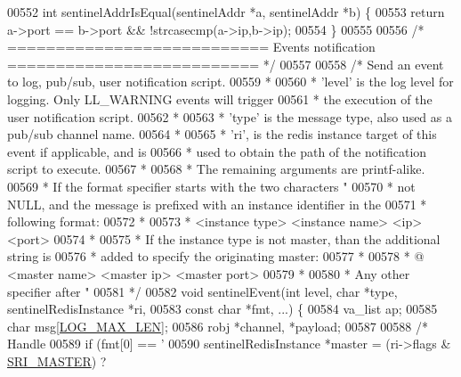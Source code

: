 \begin{DoxyCode}
{{00552 \textcolor{keywordtype}{int} sentinelAddrIsEqual(sentinelAddr *a, sentinelAddr *b) \{
00553     \textcolor{keywordflow}{return} a->port == b->port && !strcasecmp(a->ip,b->ip);
00554 \}
00555 
00556 \textcolor{comment}{/* =========================== Events notification ========================== */}
00557 
00558 \textcolor{comment}{/* Send an event to log, pub/sub, user notification script.}
00559 \textcolor{comment}{ *}
00560 \textcolor{comment}{ * 'level' is the log level for logging. Only LL\_WARNING events will trigger}
00561 \textcolor{comment}{ * the execution of the user notification script.}
00562 \textcolor{comment}{ *}
00563 \textcolor{comment}{ * 'type' is the message type, also used as a pub/sub channel name.}
00564 \textcolor{comment}{ *}
00565 \textcolor{comment}{ * 'ri', is the redis instance target of this event if applicable, and is}
00566 \textcolor{comment}{ * used to obtain the path of the notification script to execute.}
00567 \textcolor{comment}{ *}
00568 \textcolor{comment}{ * The remaining arguments are printf-alike.}
00569 \textcolor{comment}{ * If the format specifier starts with the two characters "%
00570 \textcolor{comment}{ * not NULL, and the message is prefixed with an instance identifier in the}
00571 \textcolor{comment}{ * following format:}
00572 \textcolor{comment}{ *}
00573 \textcolor{comment}{ *  <instance type> <instance name> <ip> <port>}
00574 \textcolor{comment}{ *}
00575 \textcolor{comment}{ *  If the instance type is not master, than the additional string is}
00576 \textcolor{comment}{ *  added to specify the originating master:}
00577 \textcolor{comment}{ *}
00578 \textcolor{comment}{ *  @ <master name> <master ip> <master port>}
00579 \textcolor{comment}{ *}
00580 \textcolor{comment}{ *  Any other specifier after "%
00581 \textcolor{comment}{ */}
00582 \textcolor{keywordtype}{void} sentinelEvent(\textcolor{keywordtype}{int} level, \textcolor{keywordtype}{char} *type, sentinelRedisInstance *ri,
00583                    \textcolor{keyword}{const} \textcolor{keywordtype}{char} *fmt, ...) \{
00584     va\_list ap;
00585     \textcolor{keywordtype}{char} msg[\hyperlink{server_8h_a37cd05cbfd7fb52ad21d3a822cff2ee6}{LOG\_MAX\_LEN}];
00586     robj *channel, *payload;
00587 
00588     \textcolor{comment}{/* Handle %
00589     \textcolor{keywordflow}{if} (fmt[0] == \textcolor{stringliteral}{'%
00590         sentinelRedisInstance *master = (ri->flags & \hyperlink{sentinel_8c_a2ee83e5ff67b45746cd6a310f15334b2}{SRI\_MASTER}) ?
}}}}}}
\end{DoxyCode}
